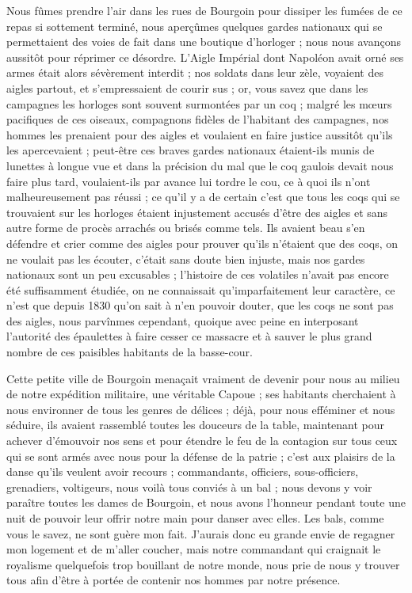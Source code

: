\documentclass[11pt,a4paper]{report}
\begin{document}
Nous fûmes prendre l'air dans les rues de Bourgoin pour dissiper les fumées de ce repas si sottement terminé, nous aperçûmes quelques gardes nationaux qui se permettaient des voies de fait dans une boutique d'horloger ; nous nous avançons aussitôt pour réprimer ce désordre. L'Aigle Impérial dont Napoléon avait orné ses armes était alors sévèrement interdit ; nos soldats dans leur zèle, voyaient des aigles partout, et s'empressaient de courir sus ; or, vous savez que dans les campagnes les horloges sont souvent surmontées par un coq ; malgré les mœurs pacifiques de ces oiseaux, compagnons fidèles de l'habitant des campagnes, nos hommes les prenaient pour des aigles et voulaient en faire justice aussitôt qu'ils les apercevaient ; peut-être ces braves gardes nationaux étaient-ils munis de lunettes à longue vue et dans la précision du mal que le coq gaulois devait nous faire plus tard, voulaient-ils par avance lui tordre le cou, ce à quoi ils n'ont malheureusement pas réussi ; ce qu'il y a de certain c'est que tous les coqs qui se trouvaient sur les horloges étaient injustement accusés d'être des aigles et sans autre forme de procès arrachés ou brisés comme tels. Ils avaient beau s'en défendre et crier comme des aigles pour prouver qu'ils n'étaient que des coqs, on ne voulait pas les écouter, c'était sans doute bien injuste, mais nos gardes nationaux sont un peu excusables ; l'histoire de ces volatiles n'avait pas encore été suffisamment étudiée, on ne connaissait qu'imparfaitement leur caractère, ce n'est que depuis 1830 qu'on sait à n'en pouvoir douter, que les coqs ne sont pas des aigles, nous parvînmes cependant, quoique avec peine en interposant l'autorité des épaulettes à faire cesser ce massacre et à sauver le plus grand nombre de ces paisibles habitants de la basse-cour.

Cette petite ville de Bourgoin menaçait vraiment de devenir pour nous au milieu de notre expédition militaire, une véritable Capoue ; ses habitants cherchaient à nous environner de tous les genres de délices ; déjà, pour nous efféminer et nous séduire, ils avaient rassemblé toutes les douceurs de la table, maintenant pour achever d'émouvoir nos sens et pour étendre le feu de la contagion sur tous ceux qui se sont armés avec nous pour la défense de la patrie ; c'est aux plaisirs de la danse qu'ils veulent avoir recours ; commandants, officiers, sous-officiers, grenadiers, voltigeurs, nous voilà tous conviés à un bal ; nous devons y voir paraître toutes les dames de Bourgoin, et nous avons l'honneur pendant toute une nuit de pouvoir leur offrir notre main pour danser avec elles. Les bals, comme vous le savez, ne sont guère mon fait. J'aurais donc eu grande envie de regagner mon logement et de m'aller coucher, mais notre commandant qui craignait le royalisme quelquefois trop bouillant de notre monde, nous prie de nous y trouver tous afin d'être à portée de contenir nos hommes par notre présence.
\end{document}
